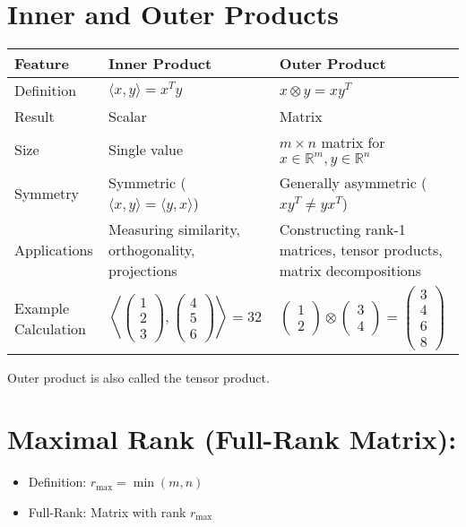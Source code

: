\documentclass{article}
\begin{document}
\section*{Inner and Outer Products}
\begin{tabular}{|l|l|l|}
\hline
\textbf{Feature} & \textbf{Inner Product} & \textbf{Outer Product} \\
\hline
Definition & $\langle x, y \rangle = x^Ty$ & $x \otimes y = xy^T$ \\
\hline
Result & Scalar & Matrix \\
\hline
Size & Single value & $m \times n$ matrix for $x \in \mathbb{R}^m, y \in \mathbb{R}^n$ \\
\hline
Symmetry & Symmetric ($\langle x, y \rangle = \langle y, x \rangle$) & Generally asymmetric ($xy^T \neq yx^T$) \\
\hline
Applications & Measuring similarity, orthogonality, projections & Constructing rank-1 matrices, tensor products, matrix decompositions \\
\hline
Example Calculation & $\left\langle \begin{pmatrix} 1 \\ 2 \\ 3 \end{pmatrix}, \begin{pmatrix} 4 \\ 5 \\ 6 \end{pmatrix} \right\rangle = 32$ & $\begin{pmatrix} 1 \\ 2 \end{pmatrix} \otimes \begin{pmatrix} 3 \\ 4 \end{pmatrix} = \begin{pmatrix} 3 \\ 4 \\ 6 \\ 8 \end{pmatrix}$ \\
\hline
\end{tabular}

Outer product is also called the tensor product.


\section{Maximal Rank (Full-Rank Matrix):}
\begin{itemize}
    \item Definition: $r_{\text{max}} = \min(m, n)$
    \item Full-Rank: Matrix with rank $r_{\text{max}}$
\end{itemize}
\end{document}
